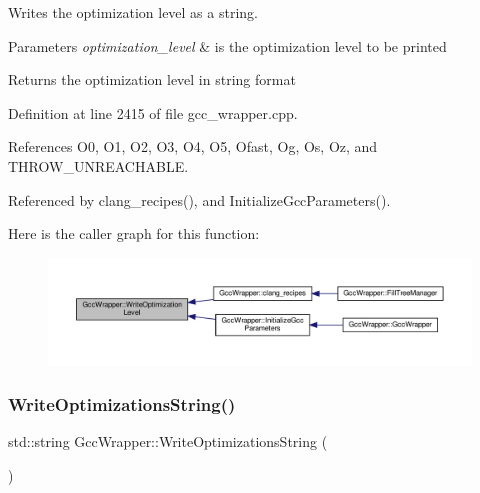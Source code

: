 Writes the optimization level as a string. 


\begin{DoxyParams}{Parameters}
{\em optimization\+\_\+level} & is the optimization level to be printed \\
\hline
\end{DoxyParams}
\begin{DoxyReturn}{Returns}
the optimization level in string format 
\end{DoxyReturn}


Definition at line 2415 of file gcc\+\_\+wrapper.\+cpp.



References O0, O1, O2, O3, O4, O5, Ofast, Og, Os, Oz, and T\+H\+R\+O\+W\+\_\+\+U\+N\+R\+E\+A\+C\+H\+A\+B\+LE.



Referenced by clang\+\_\+recipes(), and Initialize\+Gcc\+Parameters().

Here is the caller graph for this function\+:
\nopagebreak
\begin{figure}[H]
\begin{center}
\leavevmode
\includegraphics[width=350pt]{d4/dbf/classGccWrapper_a5df0314ce8643d1216b6981a333dc385_icgraph}
\end{center}
\end{figure}
\mbox{\label{classGccWrapper_ab15234a29c83e2ed44b89297ebbcd0d1}} 
\subsubsection{\texorpdfstring{Write\+Optimizations\+String()}{WriteOptimizationsString()}}
{\footnotesize\ttfamily std\+::string Gcc\+Wrapper\+::\+Write\+Optimizations\+String (\begin{DoxyParamCaption}{ }\end{DoxyParamCaption})\hspace{0.3cm}{\ttfamily [private]}}




